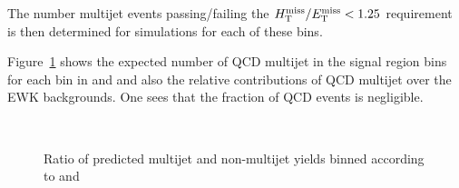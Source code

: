 The number multijet events passing/failing the $\mbox{$\mbox{$H_{\rm T}^{\rm miss}$} / \mbox{$E_\text{T}^{\rm miss}$}$} < 1.25$ requirement is then determined for simulations for each of these bins. 

Figure~\ref{fig:qcd_pred} shows the expected number of QCD multijet  in the signal region bins for each bin in \njet and \scalht and also the relative contributions of QCD multijet over the EWK backgrounds. One sees that the fraction of QCD events is negligible.



\begin{figure}[!h]
  \centering
   \\
  \caption{Ratio of predicted multijet and non-multijet yields binned according to \njet and \scalht }  \label{fig:qcd_pred}
\end{figure}
